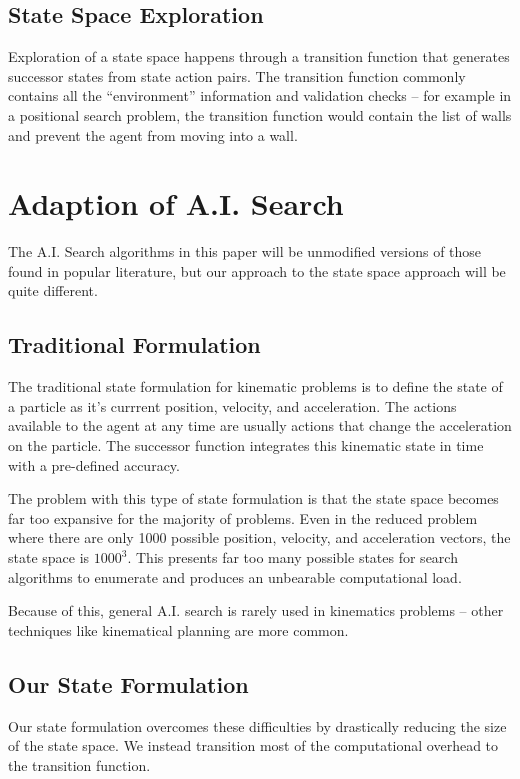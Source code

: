 	\subsection{State Space Exploration}

Exploration of a state space happens through a transition function that generates successor states from state action pairs. The transition function commonly contains all the ``environment'' information and validation checks -- for example in a positional search problem, the transition function would contain the list of walls and prevent the agent from moving into a wall.

\section{Adaption of A.I. Search}

The A.I. Search algorithms in this paper will be unmodified versions of those found in popular literature, but our approach to the state space approach will be quite different.

	\subsection{Traditional Formulation}

The traditional state formulation for kinematic problems is to define the state of a particle as it's currrent position, velocity, and acceleration. The actions available to the agent at any time are usually actions that change the acceleration on the particle. The successor function integrates this kinematic state in time with a pre-defined accuracy.

The problem with this type of state formulation is that the state space becomes far too expansive for the majority of problems. Even in the reduced problem where there are only 1000 possible position, velocity, and acceleration vectors, the state space is $1000^3$. This presents far too many possible states for search algorithms to enumerate and produces an unbearable computational load.

Because of this, general A.I. search is rarely used in kinematics problems -- other techniques like kinematical planning are more common.

	\subsection{Our State Formulation}

Our state formulation overcomes these difficulties by drastically reducing the size of the state space. We instead transition most of the computational overhead to the transition function.

